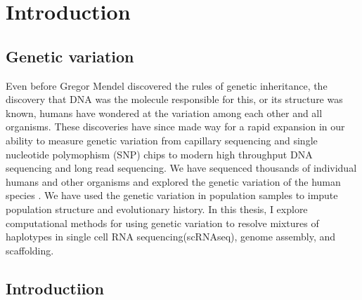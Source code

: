 
\chapter{Introduction}

\ifpdf
    \graphicspath{{Chapter1/Figs/Raster/}{Chapter1/Figs/PDF/}{Chapter1/Figs/}}
\else
    \graphicspath{{Chapter1/Figs/Vector/}{Chapter1/Figs/}}
\fi

\section{Genetic variation}

\par{
Even before Gregor Mendel discovered the rules of genetic inheritance\cite{mendel}, the discovery that DNA was the molecule responsible for this\cite{Avery}, or its structure was known\cite{watsoncrick}, humans have wondered at the variation among each other and all organisms. These discoveries have since made way for a rapid expansion in our ability to measure genetic variation from capillary sequencing\cite{capillary} and single nucleotide polymophism (SNP) chips\cite{snpchip} to modern high throughput DNA sequencing\cite{bridgeamp} and long read sequencing\cite{HIFI}. We have sequenced thousands of individual humans and other organisms and explored the genetic variation of the human species \cite{1kgenomes}\cite{1kgenomes2}\cite{haplotypepanel}\cite{ukbiobank}\cite{hapmap}. We have used the genetic variation in population samples to impute population structure and evolutionary history\cite{NGSadmix}\cite{angsd}\cite{estimateadmixture}\cite{abbababa}\cite{shapeit4}\cite{beagle}. In this thesis, I explore computational methods for using genetic variation to resolve mixtures of haplotypes in single cell RNA sequencing(scRNAseq), genome assembly, and scaffolding.
} 

\section{Introductiion}

